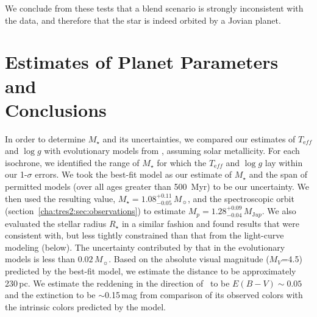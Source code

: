 We conclude from these tests that a blend scenario is strongly
inconsistent with the data, and therefore that the star is indeed
orbited by a Jovian planet.

\section[Estimates of Planet Parameters and Conclusions]{Estimates of Planet Parameters and \\ Conclusions}\label{cha:tres2:sec:discuss}

In order to determine $M_{\star}$ and its uncertainties, we compared
our estimates of $T_{\mathrm eff}$ and $\log{g}$ with evolutionary models
from \citet{Yi_Demarque_Kim:apjs:2001a}, assuming solar
metallicity. For each isochrone, we identified the range of
$M_{\star}$ for which the $T_{\mathrm eff}$ and $\log{g}$ lay within our
1-$\sigma$ errors.  We took the best-fit model as our estimate of
$M_{\star}$ and the span of permitted models (over all ages greater
than 500~Myr) to be our uncertainty.  We then used the resulting
value, $M_{\star} = 1.08^{+0.11}_{-0.05}\, M_{\sun}$, and the
spectroscopic orbit (section~\ref{cha:tres2:sec:observations}) to estimate $M_{p} = 1.28^{+0.09}_{-0.04}\,
M_{\mathrm Jup}$.  We also evaluated the stellar radius $R_{\star}$ in a
similar fashion and found results that were consistent with, but less
tightly constrained than that from the light-curve modeling (below).
The uncertainty contributed by that in the evolutionary models
is less than $0.02\,M_{\sun}$. Based on the absolute visual magnitude
 ($M_{V}$=4.5) predicted
by the best-fit model, we estimate the distance to be approximately
230\,pc. We estimate the reddening in the direction of \tresTwo\ to be
$E(B-V) \sim 0.05$ and the extinction to be $\sim$0.15\,mag from
comparison of its observed colors with the intrinsic
colors predicted by the model.

